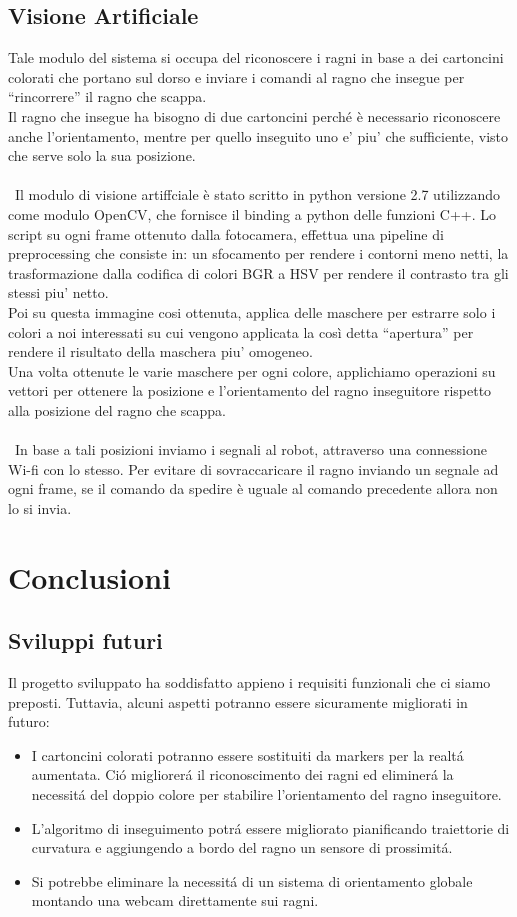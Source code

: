 \documentclass [11pt ,a4paper]{report}
\begin{document}
\section{Visione Artificiale}
Tale modulo del sistema si occupa del riconoscere i ragni in base a dei cartoncini colorati che portano sul dorso e inviare i comandi al ragno che insegue per ``rincorrere'' il ragno che scappa.\\ Il ragno che insegue ha bisogno di due cartoncini perché è necessario riconoscere anche l'orientamento, mentre per quello inseguito uno e' piu' che sufficiente, visto che serve solo la sua posizione.\-\\\-\\\
Il modulo di visione artiffciale è stato scritto in python versione 2.7 utilizzando come modulo OpenCV, che fornisce il binding a python delle funzioni C++.
Lo script su ogni frame ottenuto dalla fotocamera, effettua una pipeline di preprocessing che consiste in: un sfocamento per rendere i contorni meno netti, la trasformazione dalla codifica di colori BGR a HSV per rendere il contrasto tra gli stessi piu' netto.\\
Poi su questa immagine cosi ottenuta,  applica delle maschere per estrarre solo i colori a noi interessati su cui vengono applicata la così detta ``apertura'' per rendere il risultato della maschera piu' omogeneo.\\
Una volta ottenute le varie maschere per ogni colore, applichiamo operazioni su vettori per ottenere la posizione e l'orientamento del ragno inseguitore rispetto alla posizione del ragno che scappa.\-\\\-\\\
In base a tali posizioni inviamo i segnali al robot, attraverso una connessione Wi-fi con lo stesso. Per evitare di sovraccaricare il ragno inviando un segnale ad ogni frame, se il comando da spedire è uguale al comando precedente allora non lo si invia.


\chapter{Conclusioni}

\section{Sviluppi futuri}
Il progetto sviluppato ha soddisfatto appieno i requisiti funzionali che ci siamo preposti. Tuttavia, alcuni aspetti potranno essere sicuramente migliorati in futuro:
\begin{itemize}
\item I cartoncini colorati potranno essere sostituiti da markers per la realt\'a aumentata. Ci\'o migliorer\'a il riconoscimento dei ragni ed eliminer\'a la necessit\'a del doppio colore per stabilire l'orientamento del ragno inseguitore. 
\item L'algoritmo di inseguimento potr\'a essere migliorato pianificando traiettorie di curvatura e aggiungendo a bordo del ragno un sensore di prossimit\'a.
\item Si potrebbe eliminare la necessit\'a di un sistema di orientamento globale montando una webcam direttamente sui ragni.
\end{itemize}
\end{document}
